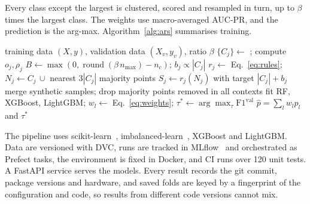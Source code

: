 Every class except the largest is clustered, scored and resampled in turn, up to $\beta$ times the largest class. The
weights use macro-averaged AUC-PR, and the prediction is the arg-max. Algorithm~\ref{alg:ars} summarises training.

\begin{algorithm}
  \caption{\ars{} training on one training split}
  \label{alg:ars}
  \small
  \begin{algorithmic}[1]
    \Require training data $(X,y)$, validation data $(X_v,y_v)$, ratio $\beta$
      \State $\{C_j\}\gets$ ; compute $o_j,\rho_j$
      \State $B\gets\max(0,\operatorname{round}(\beta\,n_{\max})-n_c)$; $b_j\propto|C_j|$
        \State $r_j\gets$ Eq.~\ref{eq:rules}; $N_j\gets C_j\,\cup$ nearest $3|C_j|$ majority points
        \State $S_j\gets r_j(N_j)$ with target $|C_j|+b_j$ 
      \EndFor
      \State merge synthetic samples; drop majority points removed in all contexts
    \EndFor
    \State fit RF, XGBoost, LightGBM; $w_l\gets$ Eq.~\ref{eq:weights}; $\tau^\ast\gets\arg\max_\tau\mathrm{F1}^{\mathrm{val}}$
    \State \Return $\hat p=\sum_l w_l p_l$ and $\tau^\ast$
  \end{algorithmic}
\end{algorithm}

The pipeline uses scikit-learn~\cite{pedregosa2011scikit}, imbalanced-learn~\cite{lemaitre2017imbalanced}, XGBoost and
LightGBM. Data are versioned with DVC, runs are tracked in MLflow~\cite{zaharia2018accelerating} and orchestrated as
Prefect tasks, the environment is fixed in Docker, and CI runs over 120 unit tests. A FastAPI service serves the
models. Every result records the git commit, package versions and hardware, and saved folds are keyed by a
fingerprint of the configuration and code, so results from different code versions cannot mix.
